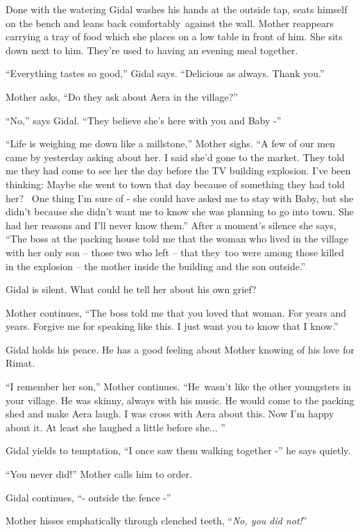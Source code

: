 \documentclass[twoside,11pt]{book}
\begin{document}
Done with the watering Gidal washes his hands at the outside tap, seats himself on the bench and leans back
comfortably~against the wall. Mother reappears carrying a tray of food which she places on a low table in front of him.
She sits down next to him. They're used to having an evening meal together.

``Everything tastes so good,'' Gidal says. ``Delicious as always. Thank
you.''

Mother asks, ``Do they ask about Aera in the village?''

``No,'' says Gidal. ``They believe she's here with you and Baby -''

``Life is weighing me down{ }like a millstone,''
Mother sighs. ``A few of our men came by yesterday asking about her. I said she'd gone to the market. They
told me they had come to see her the day before the TV building explosion. I've been thinking: Maybe she went to town
that day because of something they had told her? ~One thing I'm sure of - she could have asked me to stay with Baby,
but she didn't because she didn't want me to know she was planning to go into town. She had her reasons and I'll never
know them.'' After a moment's silence she says, ``The boss at the packing house told me that the woman who
lived in the village with her only son -- those two who left -- that they~too were among those killed in the explosion
-- the mother inside the building and the son outside.''

Gidal is silent. What could he tell her about his own grief? ~

Mother continues, ``The boss told me that you loved that woman. For years and years. Forgive me for
speaking like this. I just want you to know that I know.''

Gidal holds his peace. He has a good feeling about Mother knowing of his love for Rimat.

``I remember her son,'' Mother continues. ``He~wasn't like the other youngsters
in your village. He was skinny, always with his{ music}. He would come to the
packing shed and make Aera laugh. I was cross with Aera about this. Now I'm happy about it. At least she laughed a
little before she... ''

Gidal yields to temptation, ``I once saw them walking together -'' he says quietly.

``You never did!'' Mother calls him to order.

Gidal continues, ``- outside the fence -''

Mother hisses emphatically through clenched teeth, ``\textit{No, you did not!}''
\end{document}
